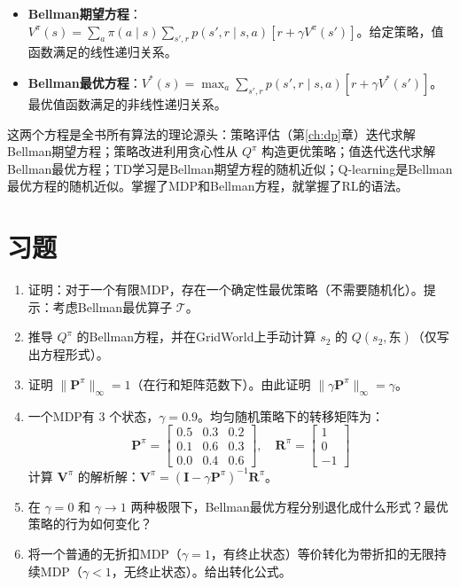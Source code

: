 \begin{itemize}
    \item \textbf{Bellman期望方程}：$V^{\pi}(s) = \sum_a \pi(a \mid s) \sum_{s',r} p(s',r \mid s,a) [r + \gamma V^{\pi}(s')]$。给定策略，值函数满足的线性递归关系。
    \item \textbf{Bellman最优方程}：$V^{*}(s) = \max_a \sum_{s',r} p(s',r \mid s,a) [r + \gamma V^{*}(s')]$。最优值函数满足的非线性递归关系。
\end{itemize}

这两个方程是全书所有算法的理论源头：策略评估（第\ref{ch:dp}章）迭代求解Bellman期望方程；策略改进利用贪心性从 $Q^{\pi}$ 构造更优策略；值迭代迭代求解Bellman最优方程；TD学习是Bellman期望方程的随机近似；Q-learning是Bellman最优方程的随机近似。掌握了MDP和Bellman方程，就掌握了RL的语法。

\section*{习题}

\begin{enumerate}
    \item 证明：对于一个有限MDP，存在一个确定性最优策略（不需要随机化）。提示：考虑Bellman最优算子 $\mathcal{T}$。
    \item 推导 $Q^{\pi}$ 的Bellman方程，并在GridWorld上手动计算 $s_2$ 的 $Q(s_2, \text{东})$（仅写出方程形式）。
    \item 证明 $\|\mathbf{P}^{\pi}\|_\infty = 1$（在行和矩阵范数下）。由此证明 $\| \gamma \mathbf{P}^{\pi} \|_\infty = \gamma$。
    \item 一个MDP有 $3$ 个状态，$\gamma = 0.9$。均匀随机策略下的转移矩阵为：
    \[
    \mathbf{P}^{\pi} = \begin{bmatrix} 0.5 & 0.3 & 0.2 \\ 0.1 & 0.6 & 0.3 \\ 0.0 & 0.4 & 0.6 \end{bmatrix}, \quad \mathbf{R}^{\pi} = \begin{bmatrix} 1 \\ 0 \\ -1 \end{bmatrix}
    \]
    计算 $\mathbf{V}^{\pi}$ 的解析解：$\mathbf{V}^{\pi} = (\mathbf{I} - \gamma \mathbf{P}^{\pi})^{-1} \mathbf{R}^{\pi}$。
    \item 在 $\gamma = 0$ 和 $\gamma \to 1$ 两种极限下，Bellman最优方程分别退化成什么形式？最优策略的行为如何变化？
    \item 将一个普通的无折扣MDP（$\gamma = 1$，有终止状态）等价转化为带折扣的无限持续MDP（$\gamma < 1$，无终止状态）。给出转化公式。
\end{enumerate}
